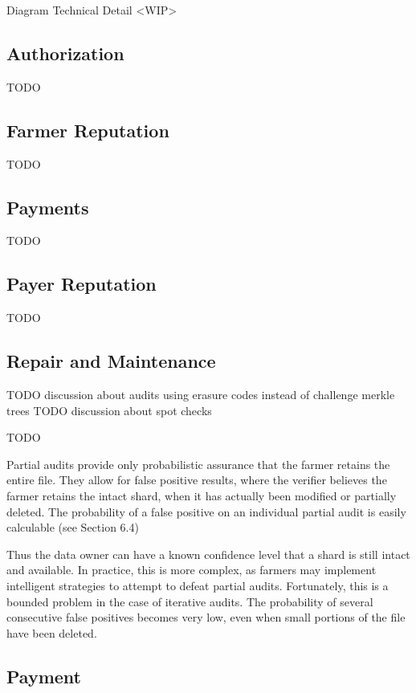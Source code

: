 \documentclass[a4paper,10pt]{article}
\newcommand{\todo}[1]{{\color{red} TODO #1}}
\begin{document}
Diagram Technical Detail
<WIP>

\subsection{Authorization}

\todo{}

\subsection{Farmer Reputation}

\todo{}

\subsection{Payments}

\todo{}

\subsection{Payer Reputation}

\todo{}

\subsection{Repair and Maintenance}

\todo{discussion about audits using erasure codes instead of challenge merkle trees}
\todo{discussion about spot checks}

\todo{

Partial audits provide only probabilistic assurance that the farmer retains the
entire file. They allow for false positive results, where the verifier believes
the farmer retains the intact shard, when it has actually been modified or
partially deleted. The probability of a false positive on an individual partial
audit is easily calculable (see Section 6.4)

Thus the data owner can have a known confidence level that a shard is still
intact and available. In practice, this is more complex, as farmers may
implement intelligent strategies to attempt to defeat partial audits.
Fortunately, this is a bounded problem in the case of iterative audits. The
probability of several consecutive false positives becomes very low, even when
small portions of the file have been deleted.
}

\subsection{Payment}
\end{document}
